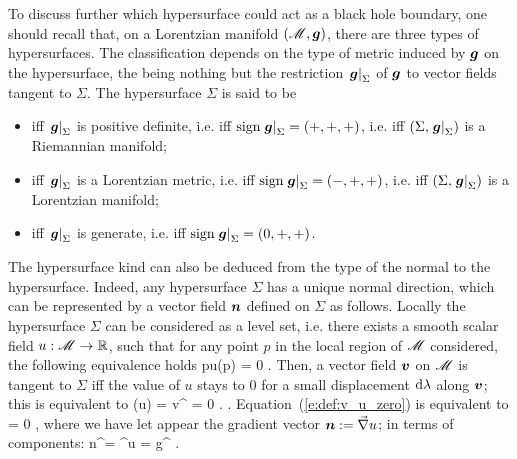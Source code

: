 To discuss further which hypersurface could act as a black hole boundary,
one should recall that, on a Lorentzian manifold $(\mathscr{M},\bm{g})$, there are
three types of hypersurfaces. The classification
depends on the type of metric induced by $\bm{g}$ on the hypersurface, the
 being
nothing but the restriction $\left.\bm{g}\right| _{\Sigma}$ of $\bm{g}$
to vector fields tangent to $\Sigma$.
The hypersurface $\Sigma$ is said to be
\begin{itemize}
\item {} iff $\left.\bm{g}\right| _{\Sigma}$ is positive definite,
i.e. iff $\mathrm{sign} \left.\bm{g}\right| _{\Sigma} = (+,+,+)$,
i.e. iff $(\Sigma,  \left.\bm{g}\right| _{\Sigma})$ is a Riemannian manifold;
\item {} iff $\left.\bm{g}\right| _{\Sigma}$ is a Lorentzian metric,
i.e. iff $\mathrm{sign} \left.\bm{g}\right| _{\Sigma} = (-,+,+)$,
i.e. iff $(\Sigma,  \left.\bm{g}\right| _{\Sigma})$ is a Lorentzian manifold;
\item {} iff $\left.\bm{g}\right| _{\Sigma}$ is generate,
i.e. iff $\mathrm{sign} \left.\bm{g}\right| _{\Sigma} = (0,+,+)$.
\end{itemize}
The hypersurface kind can also be deduced from the type of the normal to the
hypersurface.
Indeed, any hypersurface $\Sigma$ has a unique normal direction, which can
be represented by a vector field $\bm{n}$ defined on $\Sigma$ as follows.
Locally the hypersurface $\Sigma$ can be considered as a level set, i.e.
there exists a smooth scalar field $u:\mathscr{M} \rightarrow \mathbb{R}$, such that for
any point $p$ in the local region of $\mathscr{M}$ considered, the following equivalence
holds
\be
    p\in \Sigma \iff u(p) = 0 .
\ee
Then, a vector field $\bm{v}$ on $\mathscr{M}$ is tangent to $\Sigma$ iff
the value of $u$ stays to $0$ for a small displacement
$\mathrm{d}\lambda$ along $\bm{v}$; this is equivalent to
\be \label{e:def:v_u_zero}
    (u) = v^\mu {} = 0 .
.
Equation~(\ref{e:def:v_u_zero}) is equivalent to
\be
    \cdot{} = 0 ,
\ee
where we have let appear the gradient vector $\bm{n} := \vec{\nabla} u$; in
terms of components:
\be
    n^\alpha = \nabla^\alpha u = g^{\alpha\mu}  .
\ee

